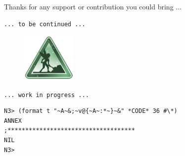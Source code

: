 \documentclass{article}
\begin{document}
\bigskip

Thanks for any support or contribution you could bring ...

\bigskip 
\bigskip

\centerline{\texttt{{\footnotesize ... to be continued ...}}}
\begin{figure}[htbp]
\begin{center}
\includegraphics[width=2.7cm]{2223}
\end{center}
\end{figure}
\vspace{-5mm}
\centerline{\texttt{{\footnotesize ... work in progress ...}}}

\newpage

\begin{lstlisting}[language=sectitle]
N3> (format t "~A~&;~v@{~A~:*~}~&" *CODE* 36 #\*)
ANNEX
;************************************
NIL
N3> 
\end{lstlisting}

\end{document}
